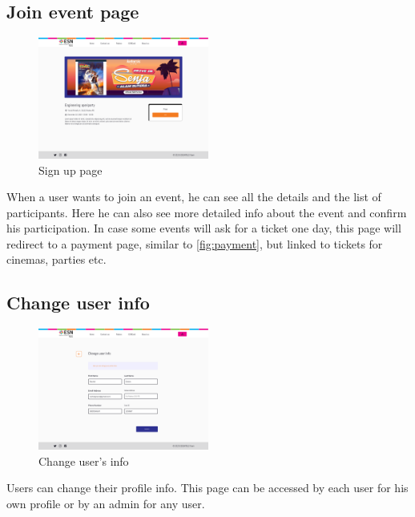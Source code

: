 \subsection{Join event page}
\begin{figure}[H]
    \centering
    \includegraphics[width=0.5\textwidth]{images/JoinEvent.png}
    \caption{Sign up page}
    \label{fig:joinEvent}
\end{figure}
When a user wants to join an event, he can see all the details and the list of participants. Here
he can also see more detailed info about the event and confirm his participation. In case some events
will ask for a ticket one day, this page will redirect to a payment page, similar to \ref{fig:payment},
but linked to tickets for cinemas, parties etc.
\subsection{Change user info}
\begin{figure}[H]
    \centering
    \includegraphics[width=0.5\textwidth]{images/ChangeUserDetail.png}
    \caption{Change user's info}
    \label{fig:change info}
\end{figure}
Users can change their profile info. This page can be accessed by each user for his own profile or 
by an admin for any user.